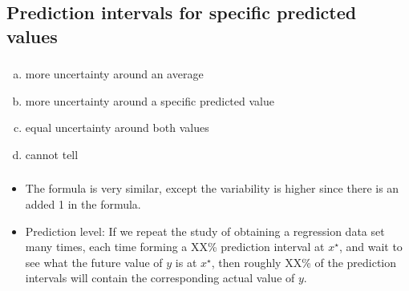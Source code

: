 \documentclass[11pt,containsverbatim,handout,xcolor=xelatex,dvipsnames,table]{beamer}
\newcommand{\solnMult}[1]{#1}
\begin{document}

\subsection{Prediction intervals for specific predicted values}


\begin{frame}
\frametitle{}


\begin{enumerate}[(a)]
\item more uncertainty around an average
\item \solnMult{more uncertainty around a specific predicted value}
\item equal uncertainty around both values
\item cannot tell
\end{enumerate}

\end{frame}


\begin{frame}
\frametitle{}


\pause

\begin{itemize}

\item The formula is very similar, except the variability is higher since there is an added 1 in the formula.

\pause

\item Prediction level: If we repeat the study of obtaining a regression data set many times, each time forming a XX\% prediction interval at $x^\star$, and wait to see what the future value of $y$ is at $x^\star$, then roughly XX\% of the prediction intervals will contain the corresponding actual value of $y$.

\end{itemize}

\end{frame}
\end{document}
